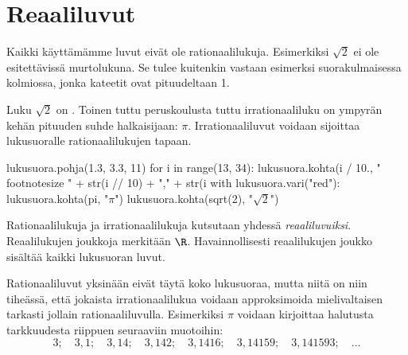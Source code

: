 \section{Reaaliluvut}

Kaikki käyttämämme luvut eivät ole rationaalilukuja. Esimerkiksi $\sqrt{2}$ ei ole esitettävissä murtolukuna. Se tulee kuitenkin vastaan esimerksi suorakulmaisessa kolmiossa, jonka kateetit ovat pituudeltaan 1.


Luku $\sqrt{2}$ on . Toinen tuttu peruskoulusta tuttu irrationaaliluku on ympyrän kehän pituuden suhde halkaisijaan: $\pi$. Irrationaaliluvut voidaan sijoittaa
lukusuoralle rationaalilukujen tapaan.

\begin{kuva}
lukusuora.pohja(1.3, 3.3, 11)
for i in range(13, 34):
	lukusuora.kohta(i / 10., "\\footnotesize " + str(i // 10) + "," + str(i %
with lukusuora.vari("red"):
	lukusuora.kohta(pi, "$\pi$")
	lukusuora.kohta(sqrt(2), "$\sqrt{2}$")
\end{kuva}



Rationaalilukuja ja irrationaalilukuja kutsutaan yhdessä \emph{reaaliluvuiksi}. Reaalilukujen joukkoja merkitään $\R$.
Havainnollisesti reaalilukujen joukko sisältää kaikki lukusuoran luvut.

Rationaaliluvut yksinään eivät täytä koko lukusuoraa, mutta niitä on niin tiheässä, että jokaista irrationaalilukua voidaan approksimoida mielivaltaisen tarkasti jollain rationaaliluvulla. Esimerkiksi $\pi$ voidaan kirjoittaa halutusta tarkkuudesta riippuen seuraaviin muotoihin:
\[
3; \quad 3,1; \quad 3,14; \quad 3,142; \quad 3,1416; \quad 3,14159; \quad 3,141593; \quad \ldots 
\]



\begin{center}
    \begin{lukusuora}{1.405}{1.425}{15}
    	
{\color{red}	}
      \end{lukusuora}
      
    \end{center}

